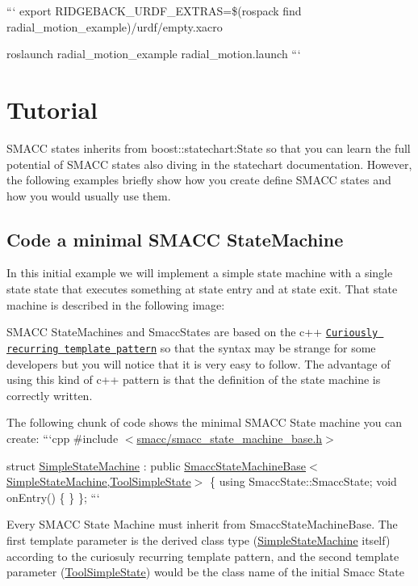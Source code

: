 ``` export R\-I\-D\-G\-E\-B\-A\-C\-K\-\_\-\-U\-R\-D\-F\-\_\-\-E\-X\-T\-R\-A\-S=\$(rospack find radial\-\_\-motion\-\_\-example)/urdf/empty.xacro

roslaunch radial\-\_\-motion\-\_\-example radial\-\_\-motion.\-launch ``` 

      

\section*{Tutorial}

S\-M\-A\-C\-C states inherits from boost\-::statechart\-:State so that you can learn the full potential of S\-M\-A\-C\-C states also diving in the statechart documentation. However, the following examples briefly show how you create define S\-M\-A\-C\-C states and how you would usually use them.

\subsection*{Code a minimal S\-M\-A\-C\-C State\-Machine}

In this initial example we will implement a simple state machine with a single state state that executes something at state entry and at state exit. That state machine is described in the following image\-:

 

S\-M\-A\-C\-C State\-Machines and Smacc\-States are based on the c++ \href{https://en.wikipedia.org/wiki/Curiously_recurring_template_pattern}{\tt Curiously recurring template pattern} so that the syntax may be strange for some developers but you will notice that it is very easy to follow. The advantage of using this kind of c++ pattern is that the definition of the state machine is correctly written.

The following chunk of code shows the minimal S\-M\-A\-C\-C State machine you can create\-: ```cpp \#include $<$\hyperlink{smacc__state__machine__base_8h_source}{smacc/smacc\-\_\-state\-\_\-machine\-\_\-base.\-h}$>$

struct \hyperlink{structSimpleStateMachine}{Simple\-State\-Machine} \-: public \hyperlink{structsmacc_1_1SmaccStateMachineBase}{Smacc\-State\-Machine\-Base$<$\-Simple\-State\-Machine,\-Tool\-Simple\-State$>$} \{ using Smacc\-State\-::\-Smacc\-State; void on\-Entry() \{ \} \}; ```

Every S\-M\-A\-C\-C State Machine must inherit from Smacc\-State\-Machine\-Base. The first template parameter is the derived class type (\hyperlink{structSimpleStateMachine}{Simple\-State\-Machine} itself) according to the curiosuly recurring template pattern, and the second template parameter (\hyperlink{structToolSimpleState}{Tool\-Simple\-State}) would be the class name of the initial Smacc State

